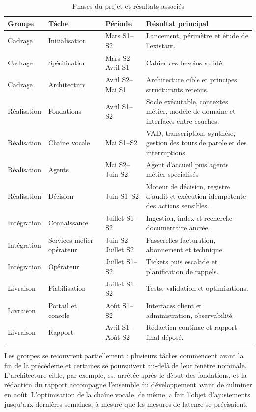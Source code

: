 \begin{table}[H]
\centering
\renewcommand{\arraystretch}{1.25}
\begin{tabular}{|p{2.0cm}|p{2.9cm}|p{3.0cm}|p{6.1cm}|}
\hline
\textbf{Groupe} & \textbf{Tâche} & \textbf{Période} & \textbf{Résultat principal} \\
\hline
Cadrage & Initialisation & Mars S1--S2 & Lancement, périmètre et étude de l'existant. \\
\hline
Cadrage & Spécification & Mars S2--Avril S1 & Cahier des besoins validé. \\
\hline
Cadrage & Architecture & Avril S2--Mai S1 & Architecture cible et principes structurants retenus. \\
\hline
Réalisation & Fondations & Avril S1--S2 & Socle exécutable, contextes métier, modèle de domaine et interfaces entre couches. \\
\hline
Réalisation & Chaîne vocale & Mai S1--S2 & VAD, transcription, synthèse, gestion des tours de parole et des interruptions. \\
\hline
Réalisation & Agents & Mai S2--Juin S2 & Agent d'accueil puis agents métier spécialisés. \\
\hline
Réalisation & Décision & Juin S1--S2 & Moteur de décision, registre d'audit et exécution idempotente des actions sensibles. \\
\hline
Intégration & Connaissance & Juillet S1--S2 & Ingestion, index et recherche documentaire ancrée. \\
\hline
Intégration & Services métier opérateur & Juin S2--Juillet S2 & Passerelles facturation, abonnement et technique. \\
\hline
Intégration & Opérateur & Juillet S1--S2 & Tickets puis escalade et planification de rappels. \\
\hline
Livraison & Fiabilisation & Juillet S1--S2 & Tests, validation et optimisations. \\
\hline
Livraison & Portail et console & Août S1--S2 & Interfaces client et administration, observabilité. \\
\hline
Livraison & Rapport & Avril S1--Août S2 & Rédaction continue et rapport final déposé. \\
\hline
\end{tabular}
\caption{Phases du projet et résultats associés}
\label{tab:phases}
\end{table}

Les groupes se recouvrent partiellement : plusieurs tâches commencent avant la fin de la précédente et certaines se poursuivent au-delà de leur fenêtre nominale. L'architecture cible, par exemple, est arrêtée après le début des fondations, et la rédaction du rapport accompagne l'ensemble du développement avant de culminer en août. L'optimisation de la chaîne vocale, de même, a fait l'objet d'ajustements jusqu'aux dernières semaines, à mesure que les mesures de latence se précisaient.


